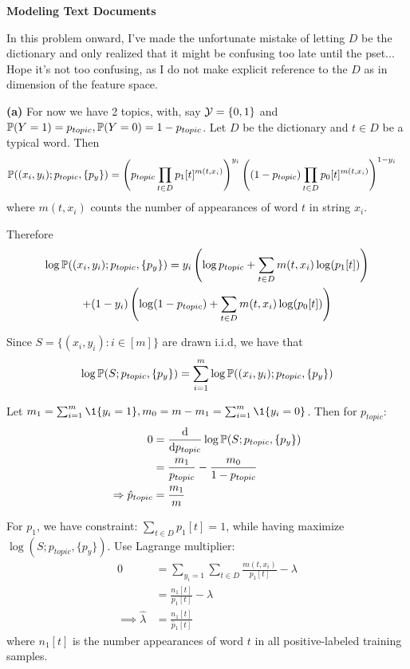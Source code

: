 \documentclass[a4paper, 11pt]{article}
\begin{document}
\textbf{\Large{Modeling Text Documents}}
\begin{problem}
 In this problem onward, I've made the unfortunate mistake of letting $D$ be the dictionary and only realized that it might be confusing too late until the pset... Hope it's not too confusing, as I do not make explicit reference to the $D$ as in dimension of the feature space.

\textbf{(a)} For now we have 2 topics, with, say $\mathcal{Y} = \{0, 1\}$ and $\mathbb{P}(Y = 1) = p_{topic}, \mathbb{P}(Y = 0) = 1 - p_{topic}$. Let $D$ be the dictionary and $t \in D$ be a typical word.
Then \begin{align*}
\mathbb{P}((x_i, y_i); p_{topic}, \{p_y\}) &= \left(p_{topic} \prod_{t \in D} p_1[t]^{m(t, x_i)}\right)^{y_i} \left((1 - p_{topic} )\prod_{t \in D} p_0[t]^{m(t, x_i)}\right)^{1 - y_i}
\end{align*}
where $m(t, x_i)$ counts the number of appearances of word $t$ in string $x_i$.

Therefore \begin{multline*}
    \log \mathbb{P}((x_i, y_i); p_{topic}, \{p_y\})  = y_i \left(\log p_{topic} + \sum_{t \in D} m(t, x_i) \log(p_1[t])\right) \\
    + (1 -y_i) \left(\log (1 - p_{topic}) + \sum_{t \in D} m(t, x_i) \log(p_0[t])\right)
\end{multline*}

Since $S = \{(x_i, y_i) : i \in [m]\}$ are drawn i.i.d, we have that \begin{equation*}
\log \mathbb{P}(S; p_{topic}, \{p_y\}) = \sum_{i=1}^{m} \log \mathbb{P}((x_i, y_i); p_{topic}, \{p_y\})
\end{equation*}

Let $m_1 = \sum_{i=1}^{m} \1 \{y_i = 1\}, m_0 = m - m_1 = \sum_{i=1}^{m} \1 \{y_i = 0\}$. Then for $p_{topic}$:
\begin{align*}
    0 &=\frac{\mathrm{d}}{\mathrm{d} p_{topic}} \log \mathbb{P}(S; p_{topic}, \{p_y\}) \\
    &=\frac{m_1}{p_{topic}} -  \frac{m_0}{1-p_{topic}} \\
    \Rightarrow \hat{p}_{topic} &= \frac{m_1}{m}
\end{align*}

For $p_1$, we have constraint: $\sum_{t \in D} p_1[t] = 1$, while having maximize $\log(S; p_{topic}, \{p_y\})$. Use Lagrange multiplier:
\begin{align*}
    0 &= \sum_{y_i = 1} \sum_{t \in D} \frac{m(t, x_i)}{p_1[t]} - \lambda \\
    &= \frac{n_1[t]}{p_1[t]} - \lambda \\
    \implies \hat{\lambda} &= \frac{n_1[t]}{\hat{p}_1[t]}
\end{align*}
where $n_1[t]$ is the number appearances of word $t$ in all positive-labeled training samples.


\end{problem}
\end{document}
